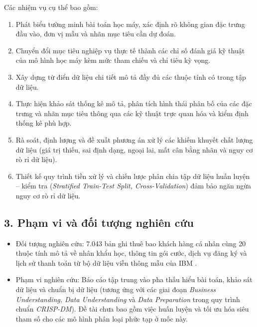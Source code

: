 \documentclass[a4paper]{article}
\begin{document}
{Các nhiệm vụ cụ thể bao gồm:
\begin{enumerate}
    \item Phát biểu tường minh bài toán học máy, xác định rõ không gian đặc trưng đầu vào, đơn vị mẫu và nhãn mục tiêu cần dự đoán.
    \item Chuyển đổi mục tiêu nghiệp vụ thực tế thành các chỉ số đánh giá kỹ thuật của mô hình học máy kèm mức tham chiếu và chỉ tiêu kỳ vọng.
    \item Xây dựng từ điển dữ liệu chi tiết mô tả đầy đủ các thuộc tính có trong tập dữ liệu.
    \item Thực hiện khảo sát thống kê mô tả, phân tích hình thái phân bố của các đặc trưng và nhãn mục tiêu thông qua các kỹ thuật trực quan hóa và kiểm định thống kê phù hợp.
    \item Rà soát, định lượng và đề xuất phương án xử lý các khiếm khuyết chất lượng dữ liệu (giá trị thiếu, sai định dạng, ngoại lai, mất cân bằng nhãn và nguy cơ rò rỉ dữ liệu).
    \item Thiết kế quy trình tiền xử lý và chiến lược phân chia tập dữ liệu huấn luyện -- kiểm tra (\textit{Stratified Train-Test Split, Cross-Validation}) đảm bảo ngăn ngừa nguy cơ rò rỉ dữ liệu.
\end{enumerate}

\subsection*{\textbf{3. Phạm vi và đối tượng nghiên cứu}}
\begin{itemize}
    \item Đối tượng nghiên cứu: 7.043 bản ghi thuê bao khách hàng cá nhân cùng 20 thuộc tính mô tả về nhân khẩu học, thông tin gói cước, dịch vụ đăng ký và lịch sử thanh toán từ bộ dữ liệu viễn thông mẫu của IBM \cite{ibm2020}.
    \item Phạm vi nghiên cứu: Báo cáo tập trung vào pha thấu hiểu bài toán, khảo sát dữ liệu và chuẩn bị dữ liệu (tương ứng với các giai đoạn \textit{Business Understanding, Data Understanding} và \textit{Data Preparation} trong quy trình chuẩn \textit{CRISP-DM}). Đề tài chưa bao gồm việc huấn luyện và tối ưu hóa siêu tham số cho các mô hình phân loại phức tạp ở mốc này.
\end{itemize}

}
\end{document}
